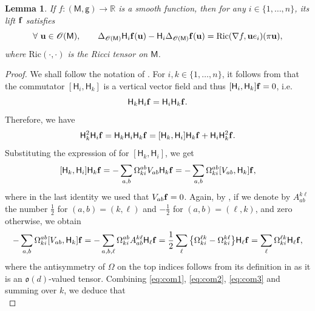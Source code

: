 \documentclass[a4paper,twoside,11pt,reqno]{amsart}
\newtheorem{lemma}[theorem]{Lemma}
\newcommand{\R}{\mathbb{R}} %
\newcommand{\li}{\bf }
\newcommand{\MM}{\mathsf{M}}
\newcommand{\GG}{\mathsf{g}}
\newcommand{\ms}{\mathscr}
\newcommand{\mr}{\mathrm}
\newcommand{\HH}{\mathsf{H}}
\begin{document}
\begin{lemma} \label{lem:ricci}
If $f:(\MM,\GG)\to\R$ is a smooth function, then for any $i\in\{1,\ldots,n\}$, its lift ${\li f}$ satisfies
\begin{equation} \label{eq:commute}
\forall \ {\bf u}\in\ms{O}(\MM),\qquad \Delta_{\ms{O}(\MM)} \HH_i {\li f}({\bf u}) - \HH_i \Delta_{\ms{O}(\MM)} {\li f}({\bf u}) = \mathrm{Ric}(\nabla f, {\bf u}e_i)(\pi {\bf u}),
\end{equation}
where $\mr{Ric}(\cdot,\cdot)$ is the Ricci tensor on $\MM$.
\end{lemma}

\begin{proof}
We shall follow the notation of \cite[Section~5.5]{Hsu02}. For $i,k\in\{1,\ldots,n\}$, it follows from \cite[Lemma~5.5.1]{Hsu02} that the commutator $[\HH_i,\HH_k]$ is a vertical vector field and thus $[\HH_i,\HH_k]{\li f}=0$, i.e.
\begin{equation}
\HH_k\HH_i {\li f} = \HH_i \HH_k{\li f}.
\end{equation}
Therefore, we have
\begin{equation} \label{eq:com1}
\HH_k^2 \HH_i {\li f} = \HH_k \HH_i \HH_k {\li f} = [\HH_k,\HH_i] \HH_k {\li f} + \HH_i \HH_k^2 {\li f}.
\end{equation}
Substituting the expression of \cite[Lemma~5.5.1]{Hsu02} for $[\HH_k,\HH_i]$, we get
\begin{equation} \label{eq:com2}
[\HH_k,\HH_i] \HH_k {\li f} = -\sum_{a,b} \Omega_{ki}^{ab} V_{ab} \HH_k {\li f} = - \sum_{a,b} \Omega_{ki}^{ab} [V_{ab}, \HH_k] {\li f},
\end{equation} 
where in the last identity we used that $V_{ab}{\li f}=0$. Again, by \cite[Lemma~5.5.1]{Hsu02}, if we denote by $A_{ab}^{k\ell}$ the number $\tfrac{1}{2}$ for $(a,b)=(k,\ell)$ and $-\tfrac{1}{2}$ for $(a,b)=(\ell,k)$, and zero otherwise, we obtain
\begin{equation} \label{eq:com3}
-\sum_{a,b} \Omega_{ki}^{ab} [V_{ab}, \HH_k] {\li f} = -\sum_{a,b,\ell} \Omega_{ki}^{ab} A_{ab}^{k\ell} \HH_\ell {\li f} = \frac{1}{2} \sum_{\ell} \big\{ \Omega_{ki}^{\ell k}-\Omega_{ki}^{k\ell}\big\} \HH_\ell{\li f} = \sum_\ell \Omega_{ki}^{\ell k} \HH_\ell {\li f},
\end{equation}
where the antisymmetry of $\Omega$ on the top indices follows from its definition in \cite[p.~153]{Hsu02} as it is an $\mathfrak{o}(d)$-valued tensor. Combining \eqref{eq:com1}, \eqref{eq:com2}, \eqref{eq:com3} and summing over $k$, we deduce that
\begin{equation}

\end{equation}
\end{proof}
\end{document}

